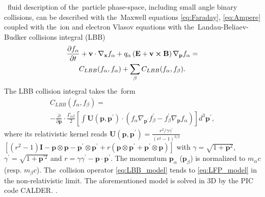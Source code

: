 ~fluid description of the~particle 
phase-space, including small angle binary collisions, can be described with 
the~Maxwell equations \eqref{eq:Faraday}, \eqref{eq:Ampere}
coupled with the~ion and electron Vlasov equations with 
the~Landau-Beliaev-Budker collisions integral (LBB)
\cite{Landau_1936, Beliaev_SPD1956} 
\begin{multline}
\frac{\partial f_\alpha}{\partial t}+\mathbf{v}\cdot\nabla_{\mathbf{x}}f_\alpha+q_\alpha\left(\mathbf{E}+\mathbf{v}\boldsymbol{\times}\mathbf{B}\right)\nabla_{\mathbf{p}}f_\alpha =
\\
C_{LBB}(f_\alpha,f_\alpha)+\sum_\beta C_{LBB}(f_\alpha,f_\beta)
.
\end{multline}
The LBB collision integral takes the~form
\begin{multline}
C_{LBB}(f_\alpha,f_\beta)=
\\
-\frac{\partial}{\partial \mathbf{p}}\cdot\frac{\Gamma_{\alpha\beta}}{2}\left[\int \mathbf{U}(\mathbf{p},\mathbf{p}^\prime)\cdot(f_\alpha\nabla_{\mathbf{p}^\prime}f_\beta^\prime-f_\beta^\prime\nabla_{\mathbf{p}}f_\alpha)\right]d^3\mathbf{p}^\prime
,
\label{eq:LBB_model}
\end{multline}
where its relativistic kernel reads
$\mathbf{U}(\mathbf{p},\mathbf{p}^\prime)=\frac{r^2/\gamma\gamma^\prime}{(r^2-1)^{3/2}}$ 
$\left[(r^2-1)\mathbf{I}-\mathbf{p}\otimes\mathbf{p}-\mathbf{p}^\prime\otimes\mathbf{p}^\prime+r(\mathbf{p}\otimes\mathbf{p}^\prime+\mathbf{p}^\prime\otimes\mathbf{p})\right]$
with $\gamma=\sqrt{1+\mathbf{p}^2}$, $\gamma^\prime=\sqrt{1+\mathbf{p}^{\prime 2}}$ and $r=\gamma\gamma^\prime-\mathbf{p}\cdot\mathbf{p}^\prime$. 
The momemtum $\mathbf{p}_\alpha$ ($\mathbf{p}_\beta$) is normalized to 
$m_\alpha c$ (resp. $m_\beta c$). The~collision operator \eqref{eq:LBB_model} 
tends to \eqref{eq:LFP_model} in the non-relativistic limit.
The aforementioned model is solved in 3D by the PIC code CALDER. 
\cite{Lefebvre_NF2003, Perez_PoP2012}.

